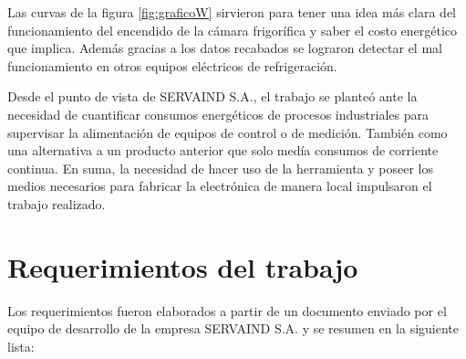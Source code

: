Las curvas de la figura \ref{fig:graficoW} sirvieron para tener una idea más clara del funcionamiento del encendido de la cámara frigorífica y saber el costo energético que implica. Además gracias a los datos recabados se lograron detectar el mal funcionamiento en otros equipos eléctricos de refrigeración.
 
Desde el punto de vista de SERVAIND S.A., el trabajo se planteó ante la necesidad de cuantificar consumos energéticos de procesos industriales para supervisar la alimentación de equipos de control o de medición. También como una alternativa a un producto anterior que solo medía consumos de corriente continua. En suma, la necesidad de hacer uso de la herramienta y poseer los medios necesarios para fabricar la electrónica de manera local  impulsaron el trabajo realizado.



\section{Requerimientos del trabajo}
\label{sec:cap2parte2}
Los requerimientos fueron elaborados a partir de un documento enviado por el equipo de desarrollo de la empresa SERVAIND S.A. y se resumen en la siguiente lista:

